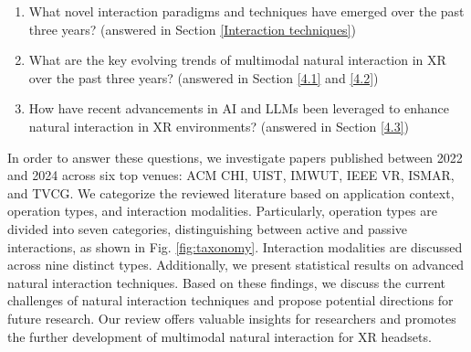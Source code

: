\documentclass[review]{fcs}
\newcommand{\revise}[2]{\textcolor[rgb]{0,0,0}{#2}}
\begin{document}
\begin{enumerate}
    \item \revise{}{What novel interaction paradigms and techniques have emerged over the past three years? (answered in Section \ref{Interaction techniques})}

    \item \revise{}{What are the key evolving trends of multimodal natural interaction in XR over the past three years? (answered in Section \ref{4.1} and \ref{4.2})}

    \item \revise{}{How have recent advancements in AI and LLMs been leveraged to enhance natural interaction in XR environments? (answered in Section \ref{4.3})}
\end{enumerate}

\revise{We focus on papers published between 2022 and 2024 across six top venues: ACM CHI, UIST, IMWUT(UbiComp), IEEE VR, ISMAR, and TVCG.}{In order to answer these questions, we investigate papers published between 2022 and 2024 across six top venues: ACM CHI, UIST, IMWUT, IEEE VR, ISMAR, and TVCG.} We categorize the reviewed literature based on application context, operation types, and interaction modalities. \revise{Specifically, operation types are divided into seven categories}{Particularly, operation types are divided into seven categories}, distinguishing between active and passive interactions, as shown in Fig. \ref{fig:taxonomy}. Interaction modalities are discussed across nine distinct types.
\revise{Additionally, we present statistical results into advanced natural interaction techniques}{Additionally, we present statistical results on advanced natural interaction techniques.}
\revise{Based on these findings, we discuss the current challenges of natural interaction techniques and suggest potential future research directions.}{Based on these findings, we discuss the current challenges of natural interaction techniques and propose potential directions for future research.} Our review offers valuable insights for researchers and promotes the further development of multimodal natural interaction for XR headsets.

\end{document}
